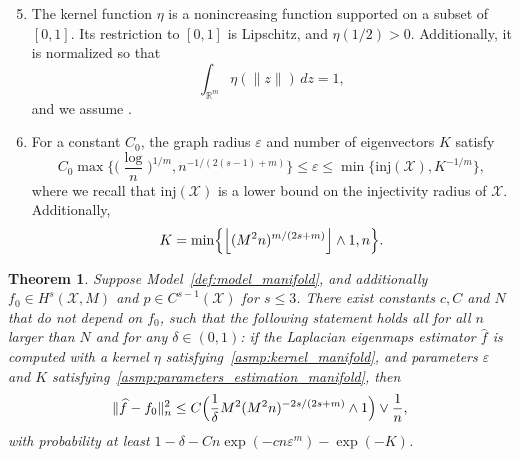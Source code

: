 \documentclass{article}
\newcommand{\Reals}{\mathbb{R}}
\newcommand{\floor}[1]{\left\lfloor #1 \right\rfloor}
\newcommand{\1}{\mathbf{1}}
\newcommand{\mc}[1]{\mathcal{#1}}
\newcommand{\wh}[1]{\widehat{#1}}
\theoremstyle{alden}
\theoremstyle{aldenthm}
\newtheorem{theorem}{Theorem}
\theoremstyle{definition}
\theoremstyle{remark}
\begin{document}
\begin{enumerate}[label=(P\arabic*)]
	\setcounter{enumi}{4}
	\item 
	\label{asmp:kernel_manifold}
	The kernel function $\eta$ is a nonincreasing function supported on a subset of $[0,1]$. Its restriction to $[0,1]$ is Lipschitz, and $\eta(1/2) > 0$. Additionally, it is normalized so that
	\begin{equation*}
	\int_{\Reals^m} \eta(\|z\|) \,dz = 1,
	\end{equation*}
	and we assume \smash{$\int_{\Reals^m} \|x\|^2 \eta(\|x\|) \,dx < \infty$}.
	\item 
	\label{asmp:parameters_estimation_manifold}
	For a constant $C_0$, the graph radius $\varepsilon$ and number of eigenvectors $K$ satisfy
	\begin{equation}
	\label{eqn:radius_estimation_manifold}
	C_0\max\biggl\{\biggl(\frac{\log}{n}\biggr)^{1/m}, n^{-1/(2(s - 1) + m)}\biggr\} \leq \varepsilon \leq \min\{\mathrm{inj}(\mc{X}), K^{-1/m}\},
	\end{equation}
	where we recall that $\mathrm{inj}(\mc{X})$ is a lower bound on the injectivity radius of $\mc{X}$. Additionally,
	\begin{equation*}
	K = \min\Bigl\{\floor{(M^2n)^{m/(2s + m)}} \wedge 1,n \Bigr\}.
	\end{equation*}
\end{enumerate}

\begin{theorem}
	\label{thm:laplacian_eigenmaps_estimation_manifold}
	Suppose Model~\ref{def:model_manifold}, and additionally $f_0 \in H^s(\mc{X},M)$ and $p \in C^{s - 1}(\mc{X})$ for $s \leq 3$. There exist constants $c,C$ and $N$ that do not depend on $f_0$, such that the following statement holds all for all $n$ larger than $N$ and for any $\delta \in (0,1)$: if the Laplacian eigenmaps estimator $\wh{f}$ is computed with a kernel $\eta$ satisfying~\ref{asmp:kernel_manifold}, and parameters $\varepsilon$ and $K$ satisfying~\ref{asmp:parameters_estimation_manifold}, then
	\begin{equation}
	\label{eqn:laplacian_eigenmaps_estimation_manifold}
	\|\wh{f} - f_0\|_n^2 \leq C\Bigl(\frac{1}{\delta}M^2(M^2n)^{-2s/(2s + m)} \wedge 1\Bigr) \vee \frac{1}{n},
	\end{equation}
	with probability at least $1 - \delta - Cn\exp(-cn\varepsilon^m) - \exp(-K)$.
\end{theorem}
\end{document}
